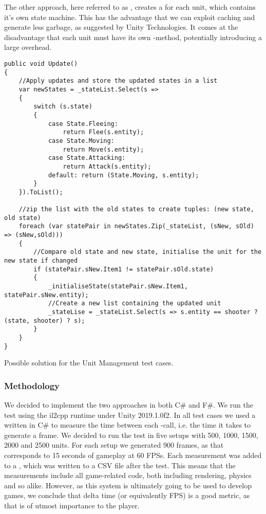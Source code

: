 The other approach, here referred to as , creates a  for each unit, which contains it's own state machine. This has the advantage that we can exploit caching and generate less garbage, as suggested by Unity Technologies\cite{unity:optimisation}. It comes at the disadvantage that each unit must have its own -method, potentially introducing a large overhead\cite{unity:runtime:calls}.

\begin{listing}
\begin{verbatim}
public void Update()
{
    //Apply updates and store the updated states in a list
    var newStates = _stateList.Select(s =>
    {
        switch (s.state)
        {
            case State.Fleeing:
                return Flee(s.entity);
            case State.Moving:
                return Move(s.entity);
            case State.Attacking:
                return Attack(s.entity);
            default: return (State.Moving, s.entity);
        }
    }).ToList();

    //zip the list with the old states to create tuples: (new state, old state)
    foreach (var statePair in newStates.Zip(_stateList, (sNew, sOld) => (sNew,sOld)))
    {
        //Compare old state and new state, initialise the unit for the new state if changed
        if (statePair.sNew.Item1 != statePair.sOld.state)
        {
            _initialiseState(statePair.sNew.Item1, statePair.sNew.entity);
            //Create a new list containing the updated unit
            _stateLise = _stateList.Select(s => s.entity == shooter ? (state, shooter) ? s);
        }
    }
}
\end{verbatim}
\caption{Possible solution for the Unit Management test cases.}
\label{lst:test:case:ai}
\end{listing}

\subsubsection{Methodology}
We decided to implement the two approaches in both C\# and F\#. We run the test using the il2cpp runtime under Unity 2019.1.0f2. In all test cases we used a  written in C\# to measure the time between each -call, i.e. the time it takes to generate a frame. We decided to run the test in five setups with 500, 1000, 1500, 2000 and 2500 units. For each setup we generated 900 frames, as that corresponds to 15 seconds of gameplay at 60 \glspl{FPS}. Each measurement was added to a , which was written to a CSV file after the test. This means that the measurements include all game-related code, both including rendering, physics and so alike. However, as this system is ultimately going to be used to develop games, we conclude that delta time (or equivalently \gls{FPS}) is a good metric, as that is of utmost importance to the player.

